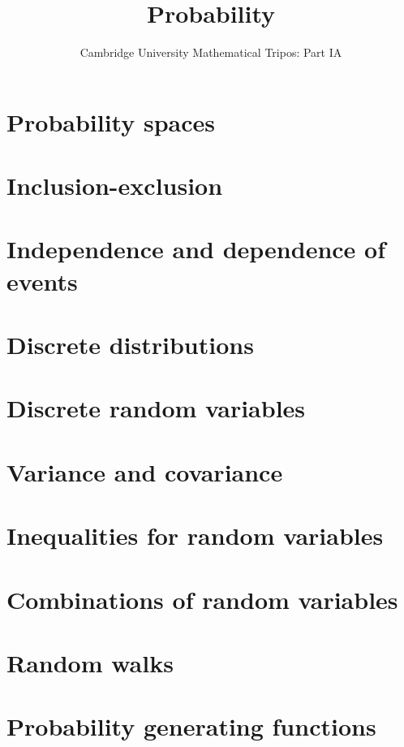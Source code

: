 \documentclass{article}
\title{Probability}
\author{Cambridge University Mathematical Tripos: Part IA}
\begin{document}
\maketitle

\tableofcontentsnewpage{}

\section{Probability spaces}

\section{Inclusion-exclusion}

\section{Independence and dependence of events}

\section{Discrete distributions}

\section{Discrete random variables}

\section{Variance and covariance}

\section{Inequalities for random variables}

\section{Combinations of random variables}

\section{Random walks}

\section{Probability generating functions}

\end{document}
